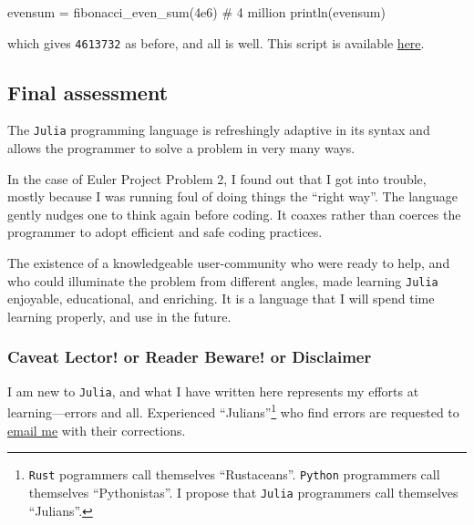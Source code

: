 \documentclass[
  a4paper,
]{article}
\newenvironment{Shaded}{\begin{snugshade}}{\end{snugshade}}
\newcommand{\CommentTok}[1]{\textcolor[rgb]{0.50,0.62,0.50}{#1}}
\newcommand{\FloatTok}[1]{\textcolor[rgb]{0.75,0.75,0.82}{#1}}
\newcommand{\FunctionTok}[1]{\textcolor[rgb]{0.94,0.94,0.56}{#1}}
\newcommand{\NormalTok}[1]{\textcolor[rgb]{0.80,0.80,0.80}{#1}}
\newcommand{\OperatorTok}[1]{\textcolor[rgb]{0.94,0.94,0.82}{#1}}
\begin{document}
\begin{Shaded}
\begin{Highlighting}[]
\NormalTok{evensum }\OperatorTok{=} \FunctionTok{fibonacci\_even\_sum}\NormalTok{(}\FloatTok{4e6}\NormalTok{) }\CommentTok{\# 4 million}
\FunctionTok{println}\NormalTok{(evensum)}
\end{Highlighting}
\end{Shaded}

which gives \texttt{4613732} as before, and all is well. This script is
available \href{auxiliary/direct-even-sum.jl}{here}.

\hypertarget{final-assessment}{%
\subsection{Final assessment}\label{final-assessment}}

The \texttt{Julia} programming language is refreshingly adaptive in its
syntax and allows the programmer to solve a problem in very many ways.

In the case of Euler Project Problem 2, I found out that I got into
trouble, mostly because I was running foul of doing things the ``right
way''. The language gently nudges one to think again before coding. It
coaxes rather than coerces the programmer to adopt efficient and safe
coding practices.

The existence of a knowledgeable user-community who were ready to help,
and who could illuminate the problem from different angles, made
learning \texttt{Julia} enjoyable, educational, and enriching. It is a
language that I will spend time learning properly, and use in the
future.

\hypertarget{caveat-lector-or-reader-beware-or-disclaimer}{%
\subsubsection{Caveat Lector! or Reader Beware! or
Disclaimer}\label{caveat-lector-or-reader-beware-or-disclaimer}}

I am new to \texttt{Julia}, and what I have written here represents my
efforts at learning---errors and all. Experienced ``Julians''\footnote{\texttt{Rust}
  pogrammers call themselves ``Rustaceans''. \texttt{Python} programmers
  call themselves ``Pythonistas''. I propose that \texttt{Julia}
  programmers call themselves ``Julians''.} who find errors are
requested to \href{mailto:feedback.swanlotus@gmail.com}{email me} with
their corrections.  \normalfont
\end{document}
